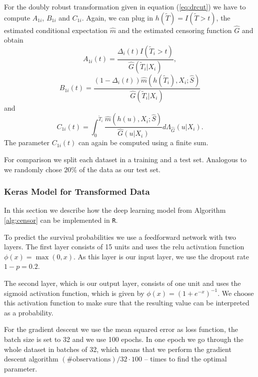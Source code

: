 \documentclass[12pt, a4paper]{scrartcl}
\theoremstyle{definition}
\theoremstyle{plain}
\numberwithin{equation}{section}
\numberwithin{figure}{section}
\numberwithin{table}{section}
\begin{document}
	For the doubly robust transformation given in equation (\ref{eq:drcut}) we have to compute $A_{1i}$, $B_{1i}$ and $C_{1i}$.
	Again, we can plug in $h(\tilde T)=I(\tilde T>t)$, the estimated conditional expectation $\hat{m}$ and the estimated censoring function $\hat{G}$ and obtain
	\begin{equation*}
		A_{1i}(t)=\frac{\Delta_i(t)I(\tilde{T}_i >t)}{\hat{G}(\tilde{T}_i\vert X_i)},
	\end{equation*}
	\begin{equation*}
		B_{1i}(t) = \frac{(1-\Delta_i(t))\hat{m}(h(\tilde{T}_i), X_i; \hat{S})}{\hat{G}(\tilde{T}_i \vert X_i)}
	\end{equation*}
	and
	\begin{equation*}
	C_{1i}(t) = \int_{0}^{\tilde T_i}\frac{\hat{m}(h(u), X_i; \hat{S})}{\hat{G}(u\vert X_i)}d\Lambda_{\hat{G}}(u \vert X_i).
	\end{equation*}
	The parameter $C_{1i}(t)$ can again be computed using a finite sum.
	
	For comparison we split each dataset in a training and a test set.
	Analogous to \citet*{basearticle} we randomly chose $20\%$ of the data as our test set.
	\subsubsection{Keras Model for Transformed Data}\label{keras}
	
	In this section we describe how the deep learning model from Algorithm \ref{alg:censor} can be implemented in \texttt{R}.
	
	To predict the survival probabilities we use a feedforward network with two layers.
	The first layer consists of 15 units and uses the relu activation function $\phi(x) = \max(0, x)$.
	As this layer is our input layer, we use the dropout rate $1-p=0.2$.
	
	The second layer, which is our output layer, consists of one unit and uses the sigmoid activation function, which is given by $\phi(x)=(1+e^{-x})^{-1}$.
	We choose this activation function to make sure that the resulting value can be interpreted as a probability.
	
	For the gradient descent we use the mean squared error as loss function, the batch size is set to 32 and we use 100 epochs.
	In one epoch we go through the whole dataset in batches of 32, which means that we perform the gradient descent algorithm $(\# \text{observations})/32\cdot100$ -- times to find the optimal parameter.
	
\end{document}
